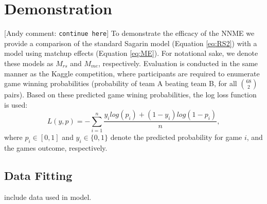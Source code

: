 \documentclass[letterpaper,12pt]{article}
\newcommand{\andyc}[1]{[{\color{red}\sc Andy comment: {\tt #1}}]}
\begin{document}
\section{Demonstration}
\andyc{continue here}
To demonstrate the efficacy of the NNME we provide a comparison of the standard Sagarin model (Equation \ref{eq:RS2}) with a model using matchup effects (Equation \ref{eq:ME}). For notational sake, we denote these models as $M_{rs}$ and $M_{me}$, respectively. Evaluation is conducted in the same manner as the Kaggle competition, where participants are required to enumerate game winning probabilities (probability of team A beating team B, for all $68 \choose 2$ pairs). Based on these predicted game wining probabilities, the log loss function is used:
\begin{equation}\label{eq:kaggle_score}
L(y,p)=-\sum_{i=1}^n\frac{y_ilog(p_i)+ (1-y_i)log(1-p_i)}{n},
\end{equation}
where $p_i\in[0,1]$ and $y_i\in\{0,1\}$ denote the predicted probability for game $i$, and the games outcome, respectively.
\subsection{Data Fitting}
include data used in model.
\end{document}
